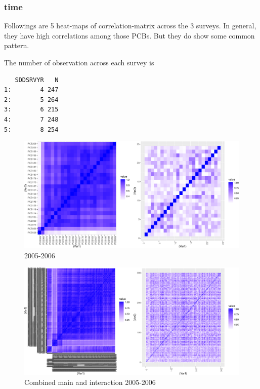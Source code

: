 \documentclass[]{article}
\begin{document}
\newpage

\subsubsection{time}\label{time-1}

Followings are 5 heat-maps of correlation-matrix across the 3 surveys.
In general, they have high correlations among those PCBs. But they do
show some common pattern.

The number of observation across each survey is

\begin{verbatim}
   SDDSRVYR   N
1:        4 247
2:        5 264
3:        6 215
4:        7 248
5:        8 254
\end{verbatim}

\newpage 

\begin{figure}
\centering
\includegraphics{PCBs_covariance_files/figure-latex/unnamed-chunk-19-1.pdf}
\caption{2005-2006}
\end{figure}

\begin{figure}
\centering
\includegraphics{PCBs_covariance_files/figure-latex/unnamed-chunk-20-1.pdf}
\caption{Combined main and interaction 2005-2006}
\end{figure}
\end{document}
